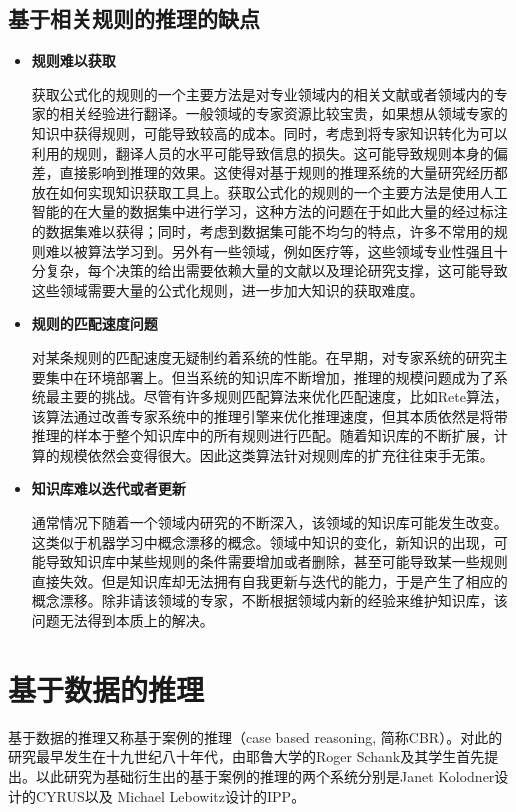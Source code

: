 \subsection{基于相关规则的推理的缺点}



\begin{itemize}

\item \textbf{规则难以获取}

获取公式化的规则的一个主要方法是对专业领域内的相关文献或者领域内的专家的相关经验进行翻译。一般领域的专家资源比较宝贵，如果想从领域专家的知识中获得规则，可能导致较高的成本。同时，考虑到将专家知识转化为可以利用的规则，翻译人员的水平可能导致信息的损失。这可能导致规则本身的偏差，直接影响到推理的效果。这使得对基于规则的推理系统的大量研究经历都放在如何实现知识获取工具上。获取公式化的规则的一个主要方法是使用人工智能的在大量的数据集中进行学习，这种方法的问题在于如此大量的经过标注的数据集难以获得；同时，考虑到数据集可能不均匀的特点，许多不常用的规则难以被算法学习到。另外有一些领域，例如医疗等，这些领域专业性强且十分复杂，每个决策的给出需要依赖大量的文献以及理论研究支撑，这可能导致这些领域需要大量的公式化规则，进一步加大知识的获取难度。

\item \textbf{规则的匹配速度问题}

对某条规则的匹配速度无疑制约着系统的性能。在早期，对专家系统的研究主要集中在环境部署上。但当系统的知识库不断增加，推理的规模问题成为了系统最主要的挑战。尽管有许多规则匹配算法来优化匹配速度，比如Rete算法\cite{Hunt2005Effects}，该算法通过改善专家系统中的推理引擎来优化推理速度，但其本质依然是将带推理的样本于整个知识库中的所有规则进行匹配。随着知识库的不断扩展，计算的规模依然会变得很大。因此这类算法针对规则库的扩充往往束手无策。

\item \textbf{知识库难以迭代或者更新}

通常情况下随着一个领域内研究的不断深入，该领域的知识库可能发生改变。这类似于机器学习中概念漂移的概念\cite{article}。领域中知识的变化，新知识的出现，可能导致知识库中某些规则的条件需要增加或者删除，甚至可能导致某一些规则直接失效。但是知识库却无法拥有自我更新与迭代的能力，于是产生了相应的概念漂移。除非请该领域的专家，不断根据领域内新的经验来维护知识库，该问题无法得到本质上的解决。

\end{itemize}



\section{基于数据的推理}
基于数据的推理又称基于案例的推理（case based reasoning, 简称CBR）。对此的研究最早发生在十九世纪八十年代，由耶鲁大学的Roger Schank及其学生首先提出\cite{Schank1982Dynamic}。以此研究为基础衍生出的基于案例的推理的两个系统分别是Janet Kolodner设计的CYRUS\cite{Schank1988SCRIPTS,LebowitzGeneralization}以及 Michael Lebowitz设计的IPP\cite{Lebowitz2005Memory}。

